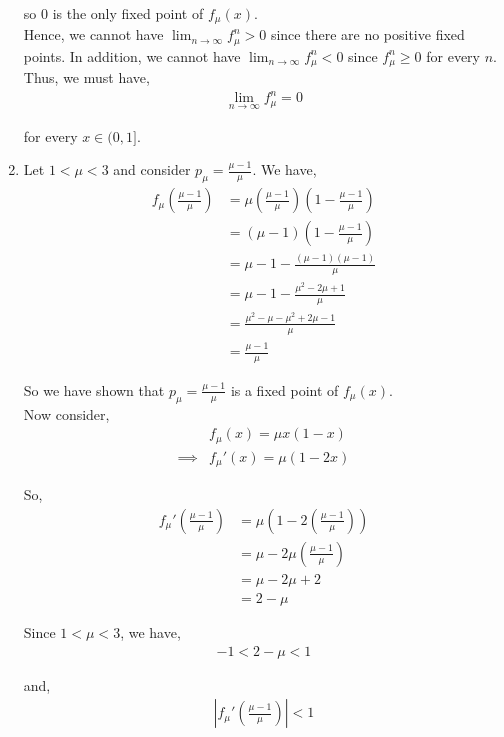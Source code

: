 \documentclass[12pt]{article}
\begin{document}
\begin{enumerate}[label=(\alph*)]
so $0$ is the only fixed point of $f_{\mu}(x)$.\\

Hence, we cannot have $\lim_{n \to \infty} f^n_{\mu} > 0$ since there are no positive fixed points. In addition, we cannot have $\lim_{n \to \infty} f^n_{\mu} < 0$ since $f^n_{\mu} \geq 0$ for every $n$. Thus, we must have,
\begin{align*}
\lim_{n \to \infty} f^n_{\mu} = 0
\end{align*}

for every $x \in (0, 1]$.

\item Let $1 < \mu < 3$ and consider $p_{\mu} = \frac{\mu-1}{\mu}$. We have,
\begin{align*}
f_{\mu}\left(\frac{\mu-1}{\mu}\right) &= \mu \left(\frac{\mu-1}{\mu}\right) \left(1 - \frac{\mu-1}{\mu}\right)\\
&= (\mu - 1) \left(1 - \frac{\mu-1}{\mu}\right)\\
&= \mu - 1 - \frac{(\mu - 1)(\mu - 1)}{\mu}\\
&= \mu - 1 - \frac{\mu^2 - 2\mu + 1}{\mu}\\
&= \frac{\mu^2 - \mu - \mu^2 + 2\mu - 1}{\mu}\\
&= \frac{\mu - 1}{\mu}
\end{align*}

So we have shown that $p_{\mu} = \frac{\mu-1}{\mu}$ is a fixed point of $f_{\mu}(x)$.\\

Now consider,
\begin{align*}
&f_{\mu}(x) = \mu x(1-x)\\
\implies &f_{\mu}'(x) = \mu (1 - 2x)
\end{align*}

So,
\begin{align*}
f_{\mu}'\left(\frac{\mu-1}{\mu}\right) &= \mu \left(1 - 2\left(\frac{\mu-1}{\mu}\right)\right)\\
&= \mu - 2\mu \left(\frac{\mu-1}{\mu}\right)\\
&= \mu - 2\mu + 2\\
&= 2 - \mu
\end{align*}

Since $1 < \mu < 3$, we have,
\begin{align*}
-1 < 2 - \mu < 1
\end{align*}

and,
\begin{align*}
\left|f_{\mu}'\left(\frac{\mu-1}{\mu}\right)\right| < 1
\end{align*}


\end{enumerate}
\end{document}
